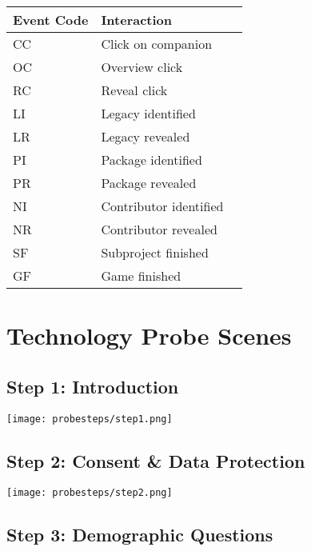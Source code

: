 \begin{appendices}
  \begin{table}[h]
    \begin{tabularx}{\textwidth}{|X|X|X|}
      \hline
      \textbf{Event Code} & \textbf{Interaction}   \\ \hline \hline
      CC                  & Click on companion     \\ \hline
      OC                  & Overview click         \\ \hline
      RC                  & Reveal click           \\ \hline
      LI                  & Legacy identified      \\ \hline
      LR                  & Legacy revealed        \\ \hline
      PI                  & Package identified     \\ \hline
      PR                  & Package revealed       \\ \hline
      NI                  & Contributor identified \\ \hline
      NR                  & Contributor revealed   \\ \hline
      SF                  & Subproject finished    \\ \hline
      GF                  & Game finished          \\ \hline
    \end{tabularx}
  \end{table}

  \newpage

  \section{Technology Probe Scenes}
  \label{append:probe-steps}

  \subsection*{Step 1: Introduction}

  \texttt{[image: probesteps/step1.png]}

  \subsection*{Step 2: Consent \& Data Protection}

  \texttt{[image: probesteps/step2.png]}

  \subsection*{Step 3: Demographic Questions}


\end{appendices}

